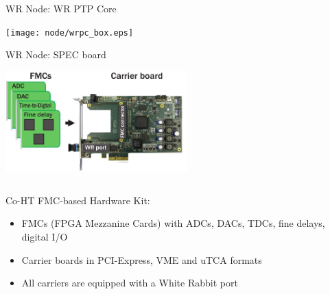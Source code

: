 \documentclass[compress,red]{beamer}
\begin{document}
\begin{frame}{WR Node: WR PTP Core}

    \begin{center}
    \texttt{[image: node/wrpc\_box.eps]}
    \end{center}

\end{frame}
\begin{frame}{WR Node: SPEC board}

    \begin{center}
    \includegraphics[width=7cm]{node/shw_kit-1}
    \end{center}

  \begin{columns}[c]

	\begin{block}{Co-HT FMC-based Hardware Kit:}
	  \begin{itemize}
	  \item FMCs (FPGA Mezzanine Cards) with ADCs, DACs, TDCs, fine delays, digital I/O
	  \item Carrier boards in PCI-Express, VME and uTCA formats
	  \item All carriers are equipped with a White Rabbit port
	  \end{itemize}
	\end{block}

  \end{columns}


\end{frame}
\end{document}
